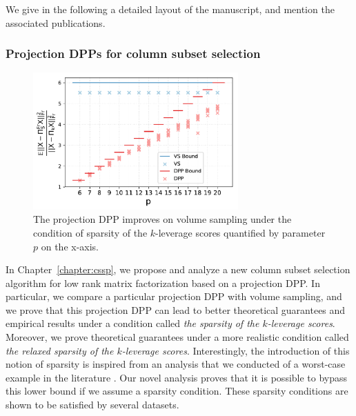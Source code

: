 \documentclass[twoside,11pt]{book}
\numberwithin{theorem}{chapter}
\numberwithin{definition}{chapter}
\numberwithin{proposition}{chapter}
\numberwithin{corollary}{chapter}
\numberwithin{example}{chapter}
\numberwithin{lemma}{chapter}
\numberwithin{assumption}{chapter}
\numberwithin{equation}{chapter}
\numberwithin{figure}{chapter}
\begin{document}


We give in the following a detailed layout of the manuscript, and mention the associated publications.

\subsubsection{Projection DPPs for column subset selection}

\begin{figure}[h]
\centering
\includegraphics[width= 0.7\textwidth]{img/cssp/numexp/toydatasets/dpp_k_5_matrices_number_100_N_100_smooth_spectrum_flat_spectrum_after}
\caption{The projection DPP improves on volume sampling under the condition of sparsity of the $k$-leverage scores quantified by parameter $p$ on the x-axis. \label{fig:intro_chapter_cssp_snapshot}}
\end{figure}

In Chapter~\ref{chapter:cssp}, we propose and analyze a new column subset selection algorithm for low rank matrix factorization based on a projection DPP. 
In particular, we compare a particular projection DPP with volume sampling, and we prove that this projection DPP can lead to better theoretical guarantees and empirical results under a condition called \emph{the sparsity of the $k$-leverage scores}. Moreover, we prove theoretical guarantees under a more realistic condition called \emph{the relaxed sparsity of the $k$-leverage scores}. Interestingly, the introduction of this notion of sparsity is inspired from an analysis that we conducted of a worst-case example in the literature \parencite{DeRa10}. Our novel analysis proves that it is possible to bypass this lower bound if we assume a sparsity condition. These sparsity conditions are shown to be satisfied by several datasets. 
\end{document}
